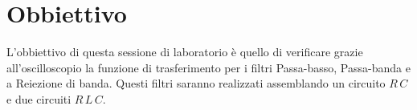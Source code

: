 \section*{Obbiettivo}

L'obbiettivo di questa sessione di laboratorio è quello di verificare grazie all'oscilloscopio la funzione di trasferimento per i filtri Passa-basso, Passa-banda e a Reiezione di banda.
Questi filtri saranno realizzati assemblando un circuito $R\,C$ e due circuiti $R\,L\,C$.